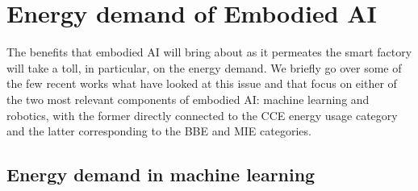 \section{Energy demand of Embodied AI}\label{sec:energy_demand_embodied_ai}
The benefits that embodied AI will bring about as it permeates the smart factory will take a toll, in particular, on the energy demand. We briefly go over some of the few recent works what have looked at this issue and that focus on either of the two most relevant components of embodied AI: machine learning and robotics, with the former directly connected to the CCE energy usage category and the latter corresponding to the BBE and MIE categories.

\subsection{Energy demand in machine learning}

